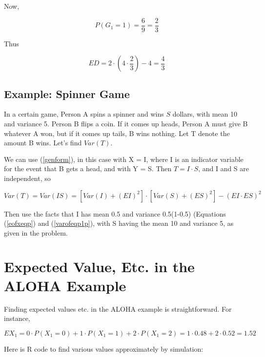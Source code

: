 Now,

\begin{equation}
P(G_1 = 1) = \frac{6}{9} = \frac{2}{3}
\end{equation}

Thus 

\begin{equation}
ED = 2 \cdot (4 \cdot \frac{2}{3}) -4  = \frac{4}{3}
\end{equation}

\subsection{Example:  Spinner Game}

In a certain game, Person A spins a spinner and wins $S$ dollars, with
mean 10 and variance 5.  Person B flips a coin.  If it comes up heads,
Person A must give B whatever A won, but if it comes up tails, B wins
nothing.  Let T denote the amount B wins.  Let's find $Var(T)$.

We can use (\ref{genform}), in this case with X = I, where I is an
indicator variable for the event that B gets a head, and with Y = S.
Then $T = I \cdot S$, and I and S are independent, so

\begin{equation}
Var(T) = Var(IS) = 
[Var(I) + (EI)^2] \cdot
[Var(S) + (ES)^2] - (EI \cdot ES)^2 
\end{equation}

Then use the facts that I has mean 0.5 and variance 0.5(1-0.5)
(Equations (\ref{eofxeqp}) and (\ref{varofeqp1p}), with S having the
mean 10 and variance 5, as given in the problem.

\section{Expected Value, Etc. in the ALOHA Example}

Finding expected values etc. in the ALOHA example is straightforward.
For instance, 

\begin{equation}
EX_1 = 0 \cdot P(X_1 = 0) + 1 \cdot P(X_1 = 1) + 2 \cdot P(X_1 = 2)
= 1 \cdot 0.48 + 2 \cdot 0.52 = 1.52
\end{equation}

Here is R code to find various values approximately by simulation:

